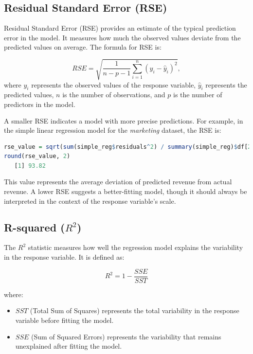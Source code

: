 \documentclass[
]{book}
\providecommand{\tightlist}{%
  \setlength{\itemsep}{0pt}\setlength{\parskip}{0pt}}
\theoremstyle{definition}
\theoremstyle{definition}
\theoremstyle{definition}
\theoremstyle{definition}
\theoremstyle{remark}
\begin{document}
\subsection*{Residual Standard Error (RSE)}\label{residual-standard-error-rse}

Residual Standard Error (RSE) provides an estimate of the typical prediction error in the model. It measures how much the observed values deviate from the predicted values on average. The formula for RSE is:

\[
RSE = \sqrt{\frac{1}{n-p-1} \sum_{i=1}^{n} (y_i - \hat{y}_i)^2},
\]
where \(y_i\) represents the observed values of the response variable, \(\hat{y}_i\) represents the predicted values, \(n\) is the number of observations, and \(p\) is the number of predictors in the model.

A smaller RSE indicates a model with more precise predictions. For example, in the simple linear regression model for the \emph{marketing} dataset, the RSE is:

\begin{lstlisting}[language=R]
rse_value = sqrt(sum(simple_reg$residuals^2) / summary(simple_reg)$df[2])
round(rse_value, 2)
   [1] 93.82
\end{lstlisting}

This value represents the average deviation of predicted revenue from actual revenue. A lower RSE suggests a better-fitting model, though it should always be interpreted in the context of the response variable's scale.

\subsection*{\texorpdfstring{R-squared (\(R^2\))}{R-squared (R\^{}2)}}\label{r-squared-r2}

The \(R^2\) statistic measures how well the regression model explains the variability in the response variable. It is defined as:

\[
R^2 = 1 - \frac{SSE}{SST}
\]

where:

\begin{itemize}
\tightlist
\item
  \(SST\) (Total Sum of Squares) represents the total variability in the response variable before fitting the model.\\
\item
  \(SSE\) (Sum of Squared Errors) represents the variability that remains unexplained after fitting the model.
\end{itemize}
\end{document}
